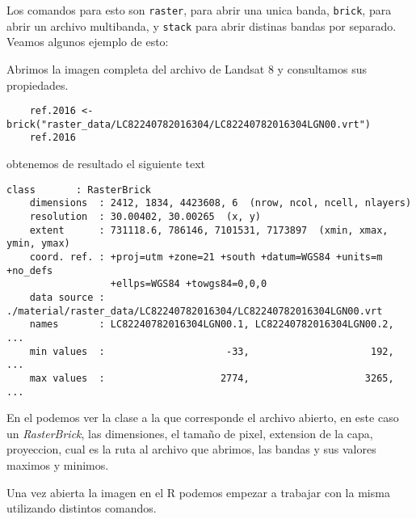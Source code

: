 Los comandos para esto son \texttt{raster}, para abrir una unica banda,
\texttt{brick}, para abrir un archivo multibanda, y \texttt{stack} para abrir
distinas bandas por separado. Veamos algunos ejemplo de esto:

\begin{exa}
    Abrimos la imagen completa del archivo de Landsat 8 y consultamos sus 
    propiedades. 
    \begin{lstlisting}
    ref.2016 <- brick("raster_data/LC82240782016304/LC82240782016304LGN00.vrt")
    ref.2016
    \end{lstlisting}
    obtenemos de resultado el siguiente text
    \begin{Verbatim}[fontsize=\small]
    class       : RasterBrick 
    dimensions  : 2412, 1834, 4423608, 6  (nrow, ncol, ncell, nlayers)
    resolution  : 30.00402, 30.00265  (x, y)
    extent      : 731118.6, 786146, 7101531, 7173897  (xmin, xmax, ymin, ymax)
    coord. ref. : +proj=utm +zone=21 +south +datum=WGS84 +units=m +no_defs 
                  +ellps=WGS84 +towgs84=0,0,0 
    data source : ./material/raster_data/LC82240782016304/LC82240782016304LGN00.vrt 
    names       : LC82240782016304LGN00.1, LC82240782016304LGN00.2, ... 
    min values  :                     -33,                     192, ... 
    max values  :                    2774,                    3265, ... 
    \end{Verbatim}
    En el podemos ver la clase a la que corresponde el archivo abierto, en este
    caso un \emph{RasterBrick}, las dimensiones, el tamaño de pixel, extension
    de la capa, proyeccion, cual es la ruta al archivo que abrimos, las bandas y
    sus valores maximos y minimos.
\end{exa}

Una vez abierta la imagen en el R podemos empezar a trabajar con la misma
utilizando distintos comandos. 

